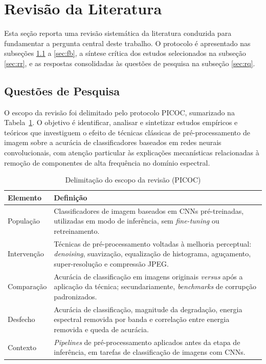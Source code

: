 \documentclass[conference]{IEEEtran}
\begin{document}
\section{Revisão da Literatura}
\label{sec:revisao}

Esta seção reporta uma revisão sistemática da literatura conduzida para
fundamentar a pergunta central deste trabalho. O protocolo é apresentado nas
subseções \ref{sec:qp} a \ref{sec:fb}, a síntese crítica dos estudos
selecionados na subseção \ref{sec:rr}, e as respostas consolidadas às questões
de pesquisa na subseção \ref{sec:rq}.

\subsection{Questões de Pesquisa}
\label{sec:qp}

O escopo da revisão foi delimitado pelo protocolo PICOC, sumarizado na
Tabela~\ref{tab:picoc}. O objetivo é identificar, analisar e sintetizar
estudos empíricos e teóricos que investiguem o efeito de técnicas clássicas de
pré-processamento de imagem sobre a acurácia de classificadores baseados em
redes neurais convolucionais, com atenção particular às explicações
mecanísticas relacionadas à remoção de componentes de alta frequência no
domínio espectral.

\begin{table}[htbp]
\caption{Delimitação do escopo da revisão (PICOC)}
\begin{center}
\begin{tabular}{|p{1.4cm}|p{6.1cm}|}
\hline
\textbf{Elemento} & \textbf{Definição} \\
\hline
População &
Classificadores de imagem baseados em CNNs pré-treinadas, utilizadas em modo
de inferência, sem \textit{fine-tuning} ou retreinamento. \\
\hline
Intervenção &
Técnicas de pré-processamento voltadas à melhoria perceptual:
\textit{denoising}, suavização, equalização de histograma, aguçamento,
super-resolução e compressão JPEG. \\
\hline
Comparação &
Acurácia de classificação em imagens originais \textit{versus} após a
aplicação da técnica; secundariamente, \textit{benchmarks} de corrupção
padronizados. \\
\hline
Desfecho &
Acurácia de classificação, magnitude da degradação, energia espectral removida
por banda e correlação entre energia removida e queda de acurácia. \\
\hline
Contexto &
\textit{Pipelines} de pré-processamento aplicados antes da etapa de
inferência, em tarefas de classificação de imagens com CNNs. \\
\hline
\end{tabular}
\label{tab:picoc}
\end{center}
\end{table}
\end{document}
